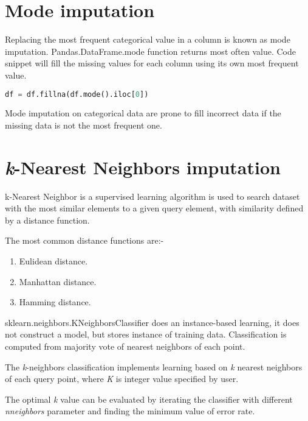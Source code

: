 \section{Mode imputation}

Replacing the most frequent categorical value in a column is known as mode imputation.  Pandas.DataFrame.mode \parencite{mckinney-proc-scipy-2010} function returns most often value. Code snippet will fill the missing values for each column using its own most frequent value.

\begin{lstlisting}[language=Python]
    df = df.fillna(df.mode().iloc[0])
\end{lstlisting}

Mode imputation on categorical data are prone to fill incorrect data if the missing data is not the most frequent one.



\section{\textit{k}-Nearest Neighbors imputation}

k-Nearest Neighbor is a supervised learning algorithm is used to search dataset with the most similar elements to a given query element, with similarity defined by a distance function. 

The most common distance functions are:-

\begin{enumerate}
    \item Eulidean distance.
    \item Manhattan distance.
    \item Hamming distance.
\end{enumerate}

sklearn.neighbors.KNeighborsClassifier \parencite{scikit-learn} does an instance-based learning, it does not construct a model, but stores instance of training data. Classification is computed from majority vote of nearest neighbors of each point.

The \textit{k}-neighbors classification implements learning based on  \textit{k} nearest neighbors of each query point, where \textit{K} is integer value specified by user.

The optimal \textit{k} value can be evaluated by iterating the classifier with different  \textit{n\textunderscore neighbors} parameter and finding the minimum value of error rate.

